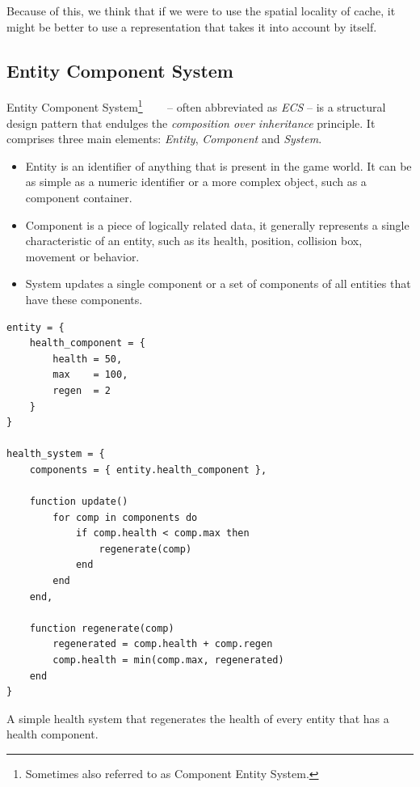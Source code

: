 Because of this, we think that if we were to use the spatial locality of cache, it might be better to use a representation that takes
it into account by itself.

\subsection{Entity Component System}

Entity Component System\footnote{Sometimes also referred to as Component Entity System.}~\cite{ECS-Wiki}~\cite{ScottBilasGDC}
~\cite{ECS-Gamedev}
-- often abbreviated as \emph{ECS} -- is a structural design pattern that endulges the \emph{composition over inheritance} principle.
It comprises three main elements: \emph{Entity}, \emph{Component} and \emph{System}.

\begin{itemize}
    \item Entity is an identifier of anything that is present in the game world. It can be as simple as a numeric 
        identifier or a more complex object, such as a component container.
    \item Component is a piece of logically related data, it generally represents a single characteristic 
        of an entity, such as its health, position, collision box, movement or behavior.
    \item System updates a single component or a set of components of all entities that have these components.
\end{itemize}

\begin{listing}[h]
    \centering
    \begin{lstlisting}
entity = {
    health_component = {
        health = 50,
        max    = 100,
        regen  = 2
    }
}

health_system = {
    components = { entity.health_component },

    function update()
        for comp in components do
            if comp.health < comp.max then
                regenerate(comp)
            end
        end
    end,

    function regenerate(comp)
        regenerated = comp.health + comp.regen
        comp.health = min(comp.max, regenerated)
    end
}
    \end{lstlisting}
    \caption{A simple health system that regenerates the health of every entity
            that has a health component.}
    \label{ecs-example}
\end{listing}

